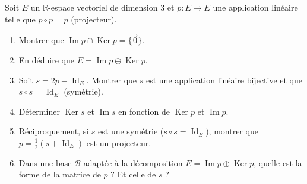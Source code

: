 \documentclass[11pt]{article}
\begin{document}
\begin{exercice}
Soit $E$ un $\mathbb{R}$-espace vectoriel de dimension 3 et $p : E \to E$ une application linéaire telle que $p \circ p = p$ (projecteur).
\begin{enumerate}
    \item Montrer que $\operatorname{Im} p \cap \operatorname{Ker} p = \{\vec{0}\}$.
    \item En déduire que $E = \operatorname{Im} p \oplus \operatorname{Ker} p$.
    \item Soit $s = 2p - \operatorname{Id}_E$. Montrer que $s$ est une application linéaire bijective et que $s \circ s = \operatorname{Id}_E$ (symétrie).
    \item Déterminer $\operatorname{Ker} s$ et $\operatorname{Im} s$ en fonction de $\operatorname{Ker} p$ et $\operatorname{Im} p$.
    \item Réciproquement, si $s$ est une symétrie ($s \circ s = \operatorname{Id}_E$), montrer que $p = \frac{1}{2}(s + \operatorname{Id}_E)$ est un projecteur.
    \item Dans une base $\mathcal{B}$ adaptée à la décomposition $E = \operatorname{Im} p \oplus \operatorname{Ker} p$, quelle est la forme de la matrice de $p$ ? Et celle de $s$ ?
\end{enumerate}
\end{exercice}
\end{document}
